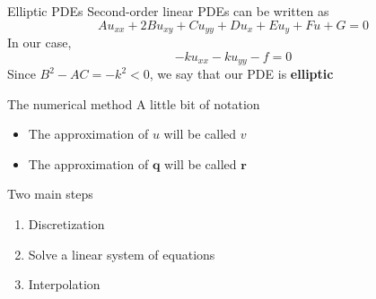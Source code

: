 \documentclass{beamer}
\begin{document}
    \begin{frame}{Elliptic PDEs}
        Second-order linear PDEs can be written as
        \begin{equation*}
            Au_{xx} + 2Bu_{xy} + Cu_{yy} + Du_x + Eu_y + Fu + G = 0
        \end{equation*}
        In our case,
        \begin{equation*}
            -ku_{xx} -ku_{yy} - f = 0
        \end{equation*}
        Since $B^2 - AC = -k^2 < 0$, we say that our PDE is \textbf{elliptic}
    \end{frame}

    \begin{frame}{The numerical method}
        A little bit of notation
        \begin{itemize}
            \item The approximation of $u$ will be called $v$
            \item The approximation of $\bm{q}$ will be called $\bm{r}$
        \end{itemize}
        Two main steps
        \begin{enumerate}
            \item Discretization
            \item Solve a linear system of equations
            \item Interpolation
        \end{enumerate}
    \end{frame}
\end{document}

